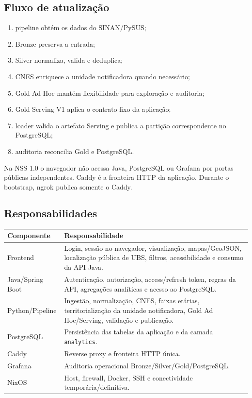 \subsection{Fluxo de atualização}

\begin{enumerate}
    \item pipeline obtém os dados do SINAN/PySUS;
    \item Bronze preserva a entrada;
    \item Silver normaliza, valida e deduplica;
    \item CNES enriquece a unidade notificadora quando necessário;
    \item Gold Ad Hoc mantém flexibilidade para exploração e auditoria;
    \item Gold Serving V1 aplica o contrato fixo da aplicação;
    \item loader valida o artefato Serving e publica a partição correspondente no PostgreSQL;
    \item auditoria reconcilia Gold e PostgreSQL.
\end{enumerate}

\begin{regra}
Na NSS 1.0 o navegador não acessa Java, PostgreSQL ou Grafana por portas públicas independentes. Caddy é a fronteira HTTP da aplicação. Durante o bootstrap, ngrok publica somente o Caddy.
\end{regra}

\subsection{Responsabilidades}

\begin{tabularx}{\textwidth}{@{}p{3.4cm}X@{}}
\toprule
\textbf{Componente} & \textbf{Responsabilidade} \\
\midrule
Frontend & Login, sessão no navegador, visualização, mapas/GeoJSON, localização pública de UBS, filtros, acessibilidade e consumo da API Java. \\
Java/Spring Boot & Autenticação, autorização, access/refresh token, regras da API, agregações analíticas e acesso ao PostgreSQL. \\
Python/Pipeline & Ingestão, normalização, CNES, faixas etárias, territorialização da unidade notificadora, Gold Ad Hoc/Serving, validação e publicação. \\
PostgreSQL & Persistência das tabelas da aplicação e da camada \texttt{analytics}. \\
Caddy & Reverse proxy e fronteira HTTP única. \\
Grafana & Auditoria operacional Bronze/Silver/Gold/PostgreSQL. \\
NixOS & Host, firewall, Docker, SSH e conectividade temporária/definitiva. \\
\bottomrule
\end{tabularx}
